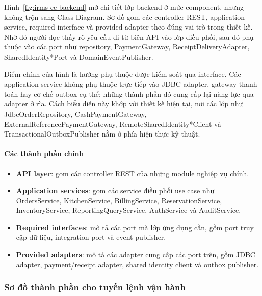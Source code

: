 Hình~\ref{fig:irms-cc-backend} mở chi tiết lớp backend ở mức component, nhưng không trộn sang Class Diagram. Sơ đồ gom các controller REST, application service, required interface và provided adapter theo đúng vai trò trong thiết kế. Nhờ đó người đọc thấy rõ yêu cầu đi từ biên API vào lớp điều phối, sau đó phụ thuộc vào các port như repository, \textsf{PaymentGateway}, \textsf{ReceiptDeliveryAdapter}, \textsf{SharedIdentity*Port} và \textsf{DomainEventPublisher}.

Điểm chính của hình là hướng phụ thuộc được kiểm soát qua interface. Các application service không phụ thuộc trực tiếp vào JDBC adapter, gateway thanh toán hay cơ chế outbox cụ thể; những thành phần đó cung cấp lại năng lực qua adapter ở rìa. Cách biểu diễn này khớp với thiết kế hiện tại, nơi các lớp như \textsf{JdbcOrderRepository}, \textsf{CashPaymentGateway}, \textsf{ExternalReferencePaymentGateway}, \textsf{RemoteSharedIdentity*Client} và \textsf{TransactionalOutboxPublisher} nằm ở phía hiện thực kỹ thuật.

\paragraph{Các thành phần chính}
\begin{itemize}
  \item \textbf{API layer}: gom các controller REST của những module nghiệp vụ chính.
  \item \textbf{Application services}: gom các service điều phối use case như \textsf{OrdersService}, \textsf{KitchenService}, \textsf{BillingService}, \textsf{ReservationService}, \textsf{InventoryService}, \textsf{ReportingQueryService}, \textsf{AuthService} và \textsf{AuditService}.
  \item \textbf{Required interfaces}: mô tả các port mà lớp ứng dụng cần, gồm port truy cập dữ liệu, integration port và event publisher.
  \item \textbf{Provided adapters}: mô tả các adapter cung cấp các port trên, gồm JDBC adapter, payment/receipt adapter, shared identity client và outbox publisher.
\end{itemize}



\subsubsection{Sơ đồ thành phần cho tuyến lệnh vận hành}


